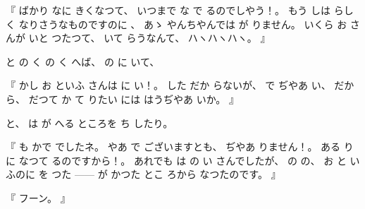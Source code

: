 %
『
ばかり
なに
きくなつて、
%
いつまで
な
で
るのでしやう！。
%
もう
しは
らしく
なりさうなものですのに
、
%
%
あゝ
やんちやんでは
が
りません。
%
いくら
お
さんが
いと
つたつて、
%
いて
らうなんて、
%
ハヽハヽハヽ。
』

%
と
の
く
の%
く
へば、
%
の
に
いて、

%
『
かし
お
といふ
さんは
に
い！。
%
した
だか
らないが、
%
で
ぢやあ
い、
%
だから、
%
だつて
か
て
りたい
には
はうぢやあ
いか。
』

%
と、
%
は
が
へる
ところを
ち
したり。

%
『
も
かで
でしたネ。
%
やあ
で
ございますとも、
%
ぢやあ
りません！。
%
ある
り
に
なつて
るのですから！。
%
あれでも
は
の
い
さんでしたが、
%
の
の、
%
お
と
いふのに
を%
つた%
{---}{---}%
が%
かつた
とこ
%
ろから
なつたのです。
』

%
『
フーン。
』

